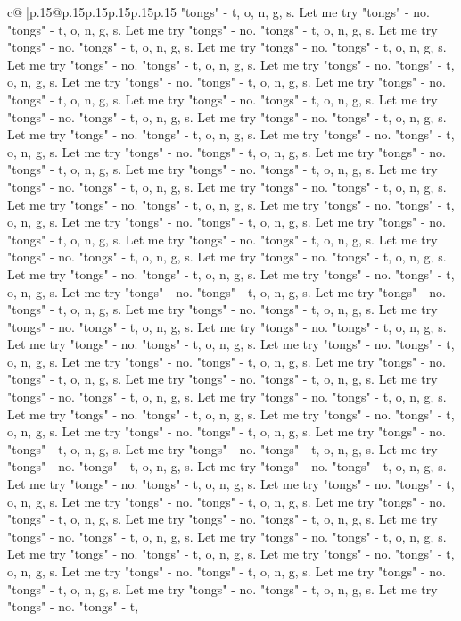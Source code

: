 \documentclass{article}
\begin{document}
{\begin{supertabular}{c@{$\;$}|p{.15\linewidth}@{}p{.15\linewidth}p{.15\linewidth}p{.15\linewidth}p{.15\linewidth}p{.15\linewidth}}
{{{"tongs" {-} t, o, n, g, s. Let me try "tongs" {-} no. "tongs" {-} t, o, n, g, s. Let me try "tongs" {-} no. "tongs" {-} t, o, n, g, s. Let me try "tongs" {-} no. "tongs" {-} t, o, n, g, s. Let me try "tongs" {-} no. "tongs" {-} t, o, n, g, s. Let me try "tongs" {-} no. "tongs" {-} t, o, n, g, s. Let me try "tongs" {-} no. "tongs" {-} t, o, n, g, s. Let me try "tongs" {-} no. "tongs" {-} t, o, n, g, s. Let me try "tongs" {-} no. "tongs" {-} t, o, n, g, s. Let me try "tongs" {-} no. "tongs" {-} t, o, n, g, s. Let me try "tongs" {-} no. "tongs" {-} t, o, n, g, s. Let me try "tongs" {-} no. "tongs" {-} t, o, n, g, s. Let me try "tongs" {-} no. "tongs" {-} t, o, n, g, s. Let me try "tongs" {-} no. "tongs" {-} t, o, n, g, s. Let me try "tongs" {-} no. "tongs" {-} t, o, n, g, s. Let me try "tongs" {-} no. "tongs" {-} t, o, n, g, s. Let me try "tongs" {-} no. "tongs" {-} t, o, n, g, s. Let me try "tongs" {-} no. "tongs" {-} t, o, n, g, s. Let me try "tongs" {-} no. "tongs" {-} t, o, n, g, s. Let me try "tongs" {-} no. "tongs" {-} t, o, n, g, s. Let me try "tongs" {-} no. "tongs" {-} t, o, n, g, s. Let me try "tongs" {-} no. "tongs" {-} t, o, n, g, s. Let me try "tongs" {-} no. "tongs" {-} t, o, n, g, s. Let me try "tongs" {-} no. "tongs" {-} t, o, n, g, s. Let me try "tongs" {-} no. "tongs" {-} t, o, n, g, s. Let me try "tongs" {-} no. "tongs" {-} t, o, n, g, s. Let me try "tongs" {-} no. "tongs" {-} t, o, n, g, s. Let me try "tongs" {-} no. "tongs" {-} t, o, n, g, s. Let me try "tongs" {-} no. "tongs" {-} t, o, n, g, s. Let me try "tongs" {-} no. "tongs" {-} t, o, n, g, s. Let me try "tongs" {-} no. "tongs" {-} t, o, n, g, s. Let me try "tongs" {-} no. "tongs" {-} t, o, n, g, s. Let me try "tongs" {-} no. "tongs" {-} t, o, n, g, s. Let me try "tongs" {-} no. "tongs" {-} t, o, n, g, s. Let me try "tongs" {-} no. "tongs" {-} t, o, n, g, s. Let me try "tongs" {-} no. "tongs" {-} t, o, n, g, s. Let me try "tongs" {-} no. "tongs" {-} t, o, n, g, s. Let me try "tongs" {-} no. "tongs" {-} t, o, n, g, s. Let me try "tongs" {-} no. "tongs" {-} t, o, n, g, s. Let me try "tongs" {-} no. "tongs" {-} t, o, n, g, s. Let me try "tongs" {-} no. "tongs" {-} t, o, n, g, s. Let me try "tongs" {-} no. "tongs" {-} t, o, n, g, s. Let me try "tongs" {-} no. "tongs" {-} t, o, n, g, s. Let me try "tongs" {-} no. "tongs" {-} t, o, n, g, s. Let me try "tongs" {-} no. "tongs" {-} t, o, n, g, s. Let me try "tongs" {-} no. "tongs" {-} t, o, n, g, s. Let me try "tongs" {-} no. "tongs" {-} t, o, n, g, s. Let me try "tongs" {-} no. "tongs" {-} t, o, n, g, s. Let me try "tongs" {-} no. "tongs" {-} t, o, n, g, s. Let me try "tongs" {-} no. "tongs" {-} t, o, n, g, s. Let me try "tongs" {-} no. "tongs" {-} t, o, n, g, s. Let me try "tongs" {-} no. "tongs" {-} t, o, n, g, s. Let me try "tongs" {-} no. "tongs" {-} t, o, n, g, s. Let me try "tongs" {-} no. "tongs" {-} t, o, n, g, s. Let me try "tongs" {-} no. "tongs" {-} t, o, n, g, s. Let me try "tongs" {-} no. "tongs" {-} t, o, n, g, s. Let me try "tongs" {-} no. "tongs" {-} t, o, n, g, s. Let me try "tongs" {-} no. "tongs" {-} t, o, n, g, s. Let me try "tongs" {-} no. "tongs" {-} t, o, n, g, s. Let me try "tongs" {-} no. "tongs" {-} t, }}}
\end{supertabular}}
\end{document}
